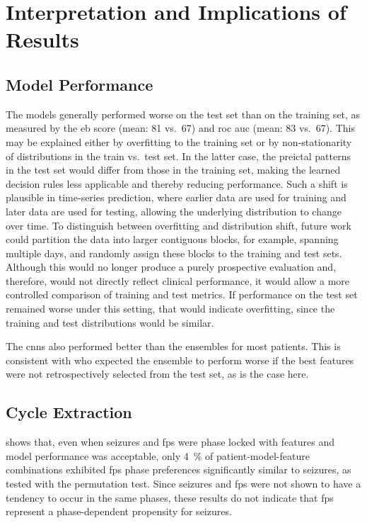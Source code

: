 \section{Interpretation and Implications of Results}
\subsection{Model Performance}
The models generally performed worse on the test set than on the training set, as measured by the \gls{eb} score (mean: 81 vs.\ 67) and \gls{roc auc} (mean: 83 vs.\ 67).
This may be explained either by overfitting to the training set or by non-stationarity of distributions in the train vs.\ test set.
In the latter case, the preictal patterns in the test set would differ from those in the training set, making the learned decision rules less applicable and thereby reducing performance.
Such a shift is plausible in time-series prediction, where earlier data are used for training and later data are used for testing, allowing the underlying distribution to change over time.
To distinguish between overfitting and distribution shift, future work could partition the data into larger contiguous blocks, for example, spanning multiple days, and randomly assign these blocks to the training and test sets.
Although this would no longer produce a purely prospective evaluation and, therefore, would not directly reflect clinical performance, it would allow a more controlled comparison of training and test metrics.
If performance on the test set remained worse under this setting, that would indicate overfitting, since the training and test distributions would be similar.

The \glspl{cnn} also performed better than the ensembles for most patients.
This is consistent with \textcite{muller_coherent_2022} who expected the ensemble to perform worse if the best features were not retrospectively selected from the test set, as is the case here.

\subsection{Cycle Extraction}
 shows that, even when seizures and \glspl{fp} were phase locked with features and model performance was acceptable, only \SI{4}{\percent} of patient-model-feature combinations exhibited \glspl{fp} phase preferences significantly similar to seizures, as tested with the permutation test.
Since seizures and \glspl{fp} were not shown to have a tendency to occur in the same phases, these results do not indicate that \glspl{fp} represent a phase-dependent propensity for seizures.

